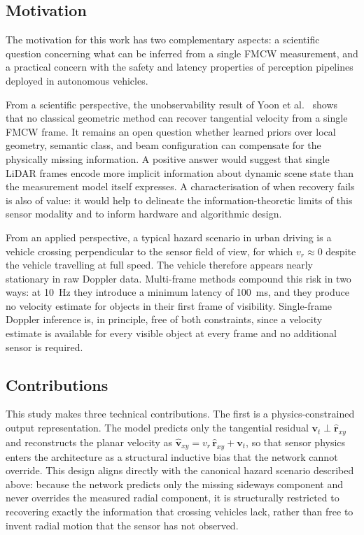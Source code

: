 \documentclass[a4paper,12pt]{article}
\begin{document}
\subsection{Motivation}

The motivation for this work has two complementary aspects: a scientific question concerning what can be inferred from a single FMCW measurement, and a practical concern with the safety and latency properties of perception pipelines deployed in autonomous vehicles.

From a scientific perspective, the unobservability result of Yoon et al.~\cite{yoon2023needforspeed} shows that no classical geometric method can recover tangential velocity from a single FMCW frame. It remains an open question whether learned priors over local geometry, semantic class, and beam configuration can compensate for the physically missing information. A positive answer would suggest that single LiDAR frames encode more implicit information about dynamic scene state than the measurement model itself expresses. A characterisation of when recovery fails is also of value: it would help to delineate the information-theoretic limits of this sensor modality and to inform hardware and algorithmic design.

From an applied perspective, a typical hazard scenario in urban driving is a vehicle crossing perpendicular to the sensor field of view, for which $v_r \approx 0$ despite the vehicle travelling at full speed. The vehicle therefore appears nearly stationary in raw Doppler data. Multi-frame methods compound this risk in two ways: at 10~Hz they introduce a minimum latency of 100~ms, and they produce no velocity estimate for objects in their first frame of visibility. Single-frame Doppler inference is, in principle, free of both constraints, since a velocity estimate is available for every visible object at every frame and no additional sensor is required.

\subsection{Contributions}

This study makes three technical contributions. The first is a physics-constrained output representation. The model predicts only the tangential residual $\mathbf{v}_t \perp \hat{\mathbf{r}}_{xy}$ and reconstructs the planar velocity as $\hat{\mathbf{v}}_{xy} = v_r\,\hat{\mathbf{r}}_{xy} + \mathbf{v}_t$, so that sensor physics enters the architecture as a structural inductive bias that the network cannot override. This design aligns directly with the canonical hazard scenario described above: because the network predicts only the missing sideways component and never overrides the measured radial component, it is structurally restricted to recovering exactly the information that crossing vehicles lack, rather than free to invent radial motion that the sensor has not observed.
\end{document}
